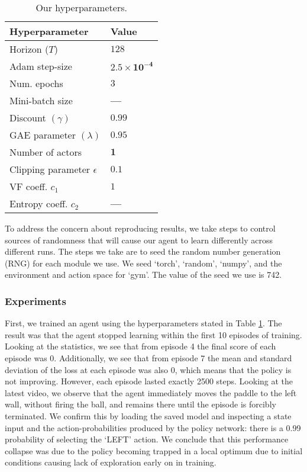 \documentclass[12pt,a4paper]{article}
\begin{document}
\begin{table}[ht]
\begin{subtable}[ht]{0.45\textwidth}
    \end{subtable}
    \hfill
    \begin{subtable}[ht]{0.45\textwidth}
        \centering
        \caption{Our hyperparameters.}
        \label{tab:our-param}
        \begin{tabular}{ l|l } 
            Hyperparameter                & Value \\
            \hline 
            Horizon ($T$)                   & $128$ \\ 
            Adam step-size                 & $\mathbf{2.5 \times 10^{-4}}$ \\
            Num. epochs                   & $3$ \\
            Mini-batch size                & \textbf{---} \\
            Discount $(\gamma)$           & $0.99$ \\
            GAE parameter $(\lambda)$     & $0.95$ \\
            Number of actors              & $\mathbf{1}$ \\
            Clipping parameter $\epsilon$ & $\mathbf{0.1}$ \\
            VF coeff. $c_1$               & $1$ \\
            Entropy coeff. $c_2$          & \textbf{---}
        \end{tabular}
     \end{subtable}
\end{table}

To address the concern about reproducing results, we take steps to control sources of randomness that will cause our agent to learn differently across different runs. The steps we take are to seed the random number generation (RNG) for each module we use. We seed `torch', `random', `numpy', and the environment and action space for `gym'. The value of the seed we use is 742.

\subsubsection{Experiments}
First, we trained an agent using the hyperparameters stated in Table \ref{tab:our-param}. The result was that the agent stopped learning within the first 10 episodes of training. Looking at the statistics, we see that from episode 4 the final score of each episode was 0. Additionally, we see that from episode 7 the mean and standard deviation of the loss at each episode was also 0, which means that the policy is not improving. However, each episode lasted exactly 2500 steps. Looking at the latest video, we observe that the agent immediately moves the paddle to the left wall, without firing the ball, and remains there until the episode is forcibly terminated. We confirm this by loading the saved model and inspecting a state input and the action-probabilities produced by the policy network: there is a 0.99 probability of selecting the `LEFT' action. We conclude that this performance collapse was due to the policy becoming trapped in a local optimum due to initial conditions causing lack of exploration early on in training. 
\end{document}
